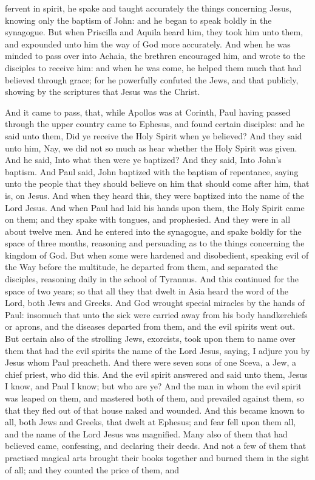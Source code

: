 fervent in spirit, he spake and taught accurately the things concerning Jesus, knowing only the baptism of John: and he began to speak boldly in the synagogue. But when Priscilla and Aquila heard him, they took him unto them, and expounded unto him the way of God more accurately. And when he was minded to pass over into Achaia, the brethren encouraged him, and wrote to the disciples to receive him: and when he was come, he helped them much that had believed through grace; for he powerfully confuted the Jews, and that publicly, showing by the scriptures that Jesus was the Christ. 

And it came to pass, that, while Apollos was at Corinth, Paul having passed through the upper country came to Ephesus, and found certain disciples: and he said unto them, Did ye receive the Holy Spirit when ye believed? And they said unto him, Nay, we did not so much as hear whether the Holy Spirit was given. And he said, Into what then were ye baptized? And they said, Into John’s baptism. And Paul said, John baptized with the baptism of repentance, saying unto the people that they should believe on him that should come after him, that is, on Jesus. And when they heard this, they were baptized into the name of the Lord Jesus. And when Paul had laid his hands upon them, the Holy Spirit came on them; and they spake with tongues, and prophesied. And they were in all about twelve men.  And he entered into the synagogue, and spake boldly for the space of three months, reasoning and persuading as to the things concerning the kingdom of God. But when some were hardened and disobedient, speaking evil of the Way before the multitude, he departed from them, and separated the disciples, reasoning daily in the school of Tyrannus. And this continued for the space of two years; so that all they that dwelt in Asia heard the word of the Lord, both Jews and Greeks. And God wrought special miracles by the hands of Paul: insomuch that unto the sick were carried away from his body handkerchiefs or aprons, and the diseases departed from them, and the evil spirits went out. But certain also of the strolling Jews, exorcists, took upon them to name over them that had the evil spirits the name of the Lord Jesus, saying, I adjure you by Jesus whom Paul preacheth. And there were seven sons of one Sceva, a Jew, a chief priest, who did this. And the evil spirit answered and said unto them, Jesus I know, and Paul I know; but who are ye? And the man in whom the evil spirit was leaped on them, and mastered both of them, and prevailed against them, so that they fled out of that house naked and wounded. And this became known to all, both Jews and Greeks, that dwelt at Ephesus; and fear fell upon them all, and the name of the Lord Jesus was magnified. Many also of them that had believed came, confessing, and declaring their deeds. And not a few of them that practised magical arts brought their books together and burned them in the sight of all; and they counted the price of them, and 